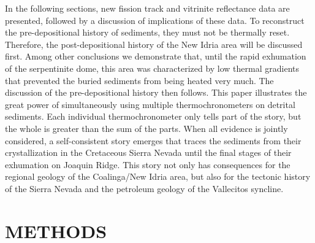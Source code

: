 \documentclass[11pt,twoside]{article}
\begin{document}
In the following sections, new fission track and vitrinite reflectance
data are presented, followed by  a discussion of implications of these
data.  To reconstruct the  pre-depositional history of sediments, they
must not be thermally reset.  Therefore, the post-depositional history
of  the  New  Idria  area   will  be  discussed  first.   Among  other
conclusions  we demonstrate that,  until the  rapid exhumation  of the
serpentinite  dome,  this  area   was  characterized  by  low  thermal
gradients that  prevented the buried sediments from  being heated very
much.  The  discussion of  the pre-depositional history  then follows.
This  paper  illustrates  the  great  power  of  simultaneously  using
multiple  thermochronometers on  detrital  sediments. Each  individual
thermochronometer  only tells  part of  the  story, but  the whole  is
greater  than the  sum of  the parts.   When all  evidence  is jointly
considered, a self-consistent story  emerges that traces the sediments
from their  crystallization in the Cretaceous Sierra  Nevada until the
final stages  of their  exhumation on Joaquin  Ridge.  This  story not
only  has consequences for  the regional  geology of  the Coalinga/New
Idria area, but also for the tectonic history of the Sierra Nevada and
the petroleum geology of the Vallecitos syncline.

\section*{\uppercase{Methods}}
\end{document}
